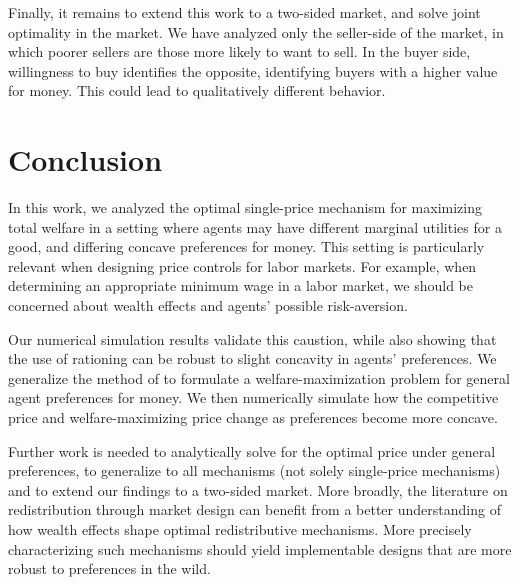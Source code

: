 \documentclass[AER]{AEA}
\begin{document}
Finally, it remains to extend this work to a two-sided market, and solve joint optimality in the market. We have analyzed only the seller-side of the market, in which poorer sellers are those more likely to want to sell. In the buyer side, willingness to buy identifies the opposite, identifying buyers with a higher value for money. This could lead to qualitatively different behavior.

\section{Conclusion}

In this work, we analyzed the optimal single-price mechanism for maximizing total welfare in a setting where agents may have different marginal utilities for a good, and differing concave preferences for money. This setting is particularly relevant when designing price controls for labor markets. For example, when determining an appropriate minimum wage in a labor market, we should be concerned about wealth effects and agents' possible risk-aversion.

Our numerical simulation results validate this caustion, while also showing that the use of rationing can be robust to slight concavity in agents' preferences. We generalize the method of \cite{dworczak-2020} to formulate a welfare-maximization problem for general agent preferences for money. We then numerically simulate how the competitive price and welfare-maximizing price change as preferences become more concave.

Further work is needed to analytically solve for the optimal price under general preferences, to generalize to all mechanisms (not solely single-price mechanisms) and to extend our findings to a two-sided market. More broadly, the literature on redistribution through market design can benefit from a better understanding of how wealth effects shape optimal redistributive mechanisms. More precisely characterizing such mechanisms should yield implementable designs that are more robust to preferences in the wild.

            
\end{document}
